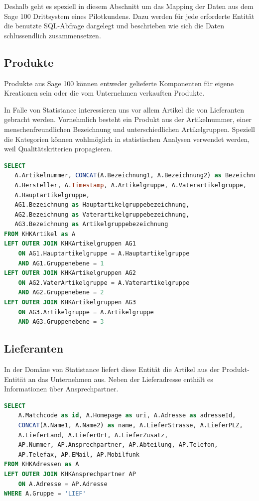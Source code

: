 Deshalb geht es speziell in diesem Abschnitt um das Mapping der Daten aus dem Sage 100 Drittsystem eines Pilotkundens. Dazu werden für jede erforderte Entität die benutzte SQL-Abfrage dargelegt und beschrieben wie sich die Daten schlussendlich zusammensetzen.

\subsection{Produkte}
Produkte aus Sage 100 können entweder gelieferte Komponenten für eigene Kreationen sein oder die vom Unternehmen verkauften Produkte.

In Falle von Statistance interessieren uns vor allem Artikel die von Lieferanten gebracht werden. Vornehmlich besteht ein Produkt aus der Artikelnummer, einer menschenfreundlichen Bezeichnung und unterschiedlichen Artikelgruppen. Speziell die Kategorien können wohlmöglich in statistischen Analysen verwendet werden, weil Qualitätskriterien propagieren.
\begin{lstlisting}[language=SQL,caption=Artikel Join SQL Query]
SELECT
   A.Artikelnummer, CONCAT(A.Bezeichnung1, A.Bezeichnung2) as Bezeichnung,
   A.Hersteller, A.Timestamp, A.Artikelgruppe, A.Vaterartikelgruppe,
   A.Hauptartikelgruppe,
   AG1.Bezeichnung as Hauptartikelgruppebezeichnung,
   AG2.Bezeichnung as Vaterartikelgruppebezeichnung,
   AG3.Bezeichnung as Artikelgruppebezeichnung
FROM KHKArtikel as A
LEFT OUTER JOIN KHKArtikelgruppen AG1
    ON AG1.Hauptartikelgruppe = A.Hauptartikelgruppe
    AND AG1.Gruppenebene = 1
LEFT OUTER JOIN KHKArtikelgruppen AG2
    ON AG2.VaterArtikelgruppe = A.Vaterartikelgruppe
    AND AG2.Gruppenebene = 2
LEFT OUTER JOIN KHKArtikelgruppen AG3
    ON AG3.Artikelgruppe = A.Artikelgruppe
    AND AG3.Gruppenebene = 3
\end{lstlisting}

\subsection{Lieferanten}
In der Domäne von Statistance liefert diese Entität die Artikel aus der Produkt-Entität an das Unternehmen aus. Neben der Lieferadresse enthält es Informationen über Ansprechpartner.
\begin{lstlisting}[language=SQL,caption=Zulieferer Join SQL Query]
SELECT
    A.Matchcode as id, A.Homepage as uri, A.Adresse as adresseId,
    CONCAT(A.Name1, A.Name2) as name, A.LieferStrasse, A.LieferPLZ,
    A.LieferLand, A.LieferOrt, A.LieferZusatz,
    AP.Nummer, AP.Ansprechpartner, AP.Abteilung, AP.Telefon,
    AP.Telefax, AP.EMail, AP.Mobilfunk
FROM KHKAdressen as A
LEFT OUTER JOIN KHKAnsprechpartner AP
    ON A.Adresse = AP.Adresse
WHERE A.Gruppe = 'LIEF'
\end{lstlisting}

